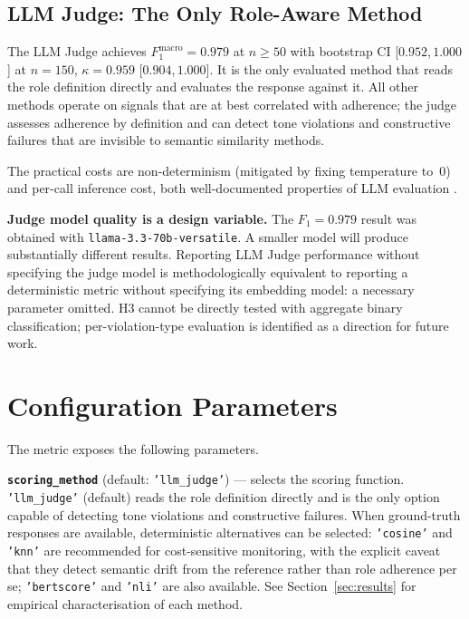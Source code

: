\documentclass[11pt,a4paper]{article}
\begin{document}
\subsection{LLM Judge: The Only Role-Aware Method}

The LLM Judge achieves $F_1^{\text{macro}} = 0.979$ at $n \geq 50$ with
bootstrap CI [$0.952$,\,$1.000$] at $n = 150$, $\kappa = 0.959$
[$0.904$,\,$1.000$]. It is the only evaluated method that reads the role
definition directly and evaluates the response against it. All other methods
operate on signals that are at best correlated with adherence; the judge
assesses adherence by definition and can detect tone violations and
constructive failures that are invisible to semantic similarity methods.

The practical costs are non-determinism (mitigated by fixing temperature to~0)
and per-call inference cost, both well-documented properties of LLM evaluation
\citep{zheng2023judging}.

\textbf{Judge model quality is a design variable.} The $F_1 = 0.979$ result
was obtained with \texttt{llama-3.3-70b-versatile}. A smaller model will
produce substantially different results. Reporting LLM Judge performance
without specifying the judge model is methodologically equivalent to reporting
a deterministic metric without specifying its embedding model: a necessary
parameter omitted. H3 cannot be directly tested with aggregate binary
classification; per-violation-type evaluation is identified as a direction for
future work.

\section{Configuration Parameters}
\label{sec:scoring_params}

The metric exposes the following parameters.

\textbf{\texttt{scoring\_method}} (default: \texttt{'llm\_judge'}) ---
selects the scoring function. \texttt{'llm\_judge'} (default) reads the
role definition directly and is the only option capable of detecting tone
violations and constructive failures. When ground-truth responses are
available, deterministic alternatives can be selected: \texttt{'cosine'}
and \texttt{'knn'} are recommended for cost-sensitive monitoring, with the
explicit caveat that they detect semantic drift from the reference rather
than role adherence per se; \texttt{'bertscore'} and \texttt{'nli'} are
also available. See Section~\ref{sec:results} for empirical characterisation
of each method.
\end{document}
